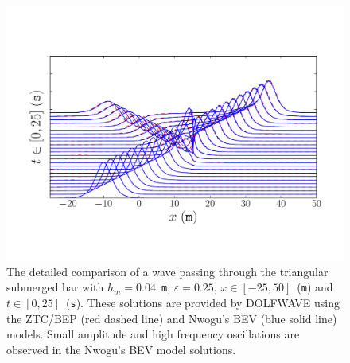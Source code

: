 \begin{figure}
  \begin{center}
    \includegraphics[width=\largefig]{chapters/lopes/pdf/epsilon0_25.pdf}
  \end{center}
  \caption{The detailed comparison of a wave passing through the
    triangular submerged bar with $h_m=0.04$~{\tt m}, $\varepsilon=0.25$,
    $x\in[-25,50]$~({\tt m}) and $t\in[0,25]$~({\tt s}).  These solutions
    are provided by DOLFWAVE using the ZTC/BEP (red dashed line) and
    Nwogu's BEV (blue solid line) models.  Small amplitude and high
    frequency oscillations are observed in the Nwogu's BEV model
    solutions.}
  \label{fig:lopes:znspike025}
\end{figure}


